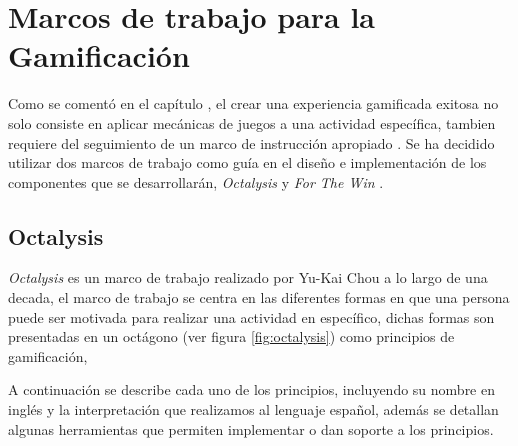 \section{Marcos de trabajo para la Gamificación}

 Como se comentó en el capítulo , el crear una experiencia
 gamificada exitosa no solo consiste en aplicar mecánicas de juegos a una actividad
 específica, tambien requiere del seguimiento de un marco de instrucción apropiado \cite[p. 1110]{GamInE-Learning}.
 Se ha decidido utilizar dos marcos de trabajo como guía en el diseño e implementación
 de los componentes que se desarrollarán, {\it Octalysis} \cite{Octalysis} y
 {\it For The Win} \cite{FrameWorkForTheWin}.

\subsection{Octalysis}
\label{sec:octalysis}

 {\it Octalysis} es un marco de trabajo realizado por Yu-Kai Chou a lo largo de
 una decada, el marco de trabajo se centra en las diferentes formas en que una
 persona puede ser motivada para realizar una actividad en específico, dichas
 formas son presentadas en un octágono (ver figura \ref{fig:octalysis}) como principios
 de gamificación,

    
    
 \noindent A continuación se describe cada uno de los principios, incluyendo su nombre en
 inglés y la interpretación que realizamos al lenguaje español, además se detallan algunas
 herramientas que permiten implementar o dan soporte a los principios.
    
\subsubsection{\principioI} \label{subsec:principioI}
  
